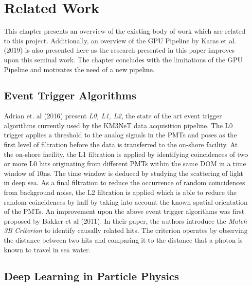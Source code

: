 \chapter{Related Work}
\label{cha:related-work}

This chapter presents an overview of the existing body of work which
are related to this project. Additionally, an overview of the GPU
Pipeline by Karas et al. (2019) is also presented here as the research
presented in this paper improves upon this seminal work. The chapter
concludes with the limitations of the GPU Pipeline and motivates the
need of a new pipeline.

\section{Event Trigger Algorithms}
\label{sec:trigger-algos}

Adrian et. al (2016) present \emph{L0, L1, L2}, the state of the art
event trigger algorithms currently used by the KM3NeT data acquisition
pipeline. The L0 trigger applies a threshold to the analog signals in
the PMTs and poses as the first level of filtration before the data is
transferred to the on-shore facility. At the on-shore facility, the L1
filtration is applied by identifying coincidences of two or more L0
hits originating from different PMTs within the same DOM in a time
window of 10ns. The time window is deduced by studying the scattering
of light in deep sea. As a final filtration to reduce the occurrence
of random coincidences from background noise, the L2 filtration is
applied which is able to reduce the random coincidences by half by
taking into account the known spatial orientation of the PMTs. An
improvement upon the above event trigger algorithms was first proposed
by Bakker et al (2011). In their paper, the authors introduce the
\emph{Match 3B Criterion} to identify causally related hits. The
criterion operates by observing the distance between two hits and
comparing it to the distance that a photon is known to travel in sea
water.

\section{Deep Learning in Particle Physics}
\label{sec:dl-part-phy}

